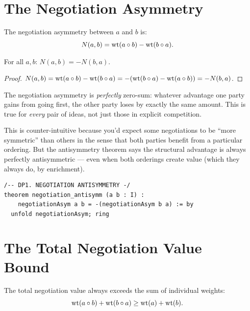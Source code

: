 \section{The Negotiation Asymmetry}

\begin{definition}
The negotiation asymmetry between $a$ and $b$ is:
\[
N(a,b) = \operatorname{wt}(a \circ b) - \operatorname{wt}(b \circ a).
\]
\end{definition}

\begin{theorem}
\label{thm:negotiation-antisymm}
For all $a, b$: $N(a,b) = -N(b,a)$.
\end{theorem}

\begin{proof}
$N(a,b) = \operatorname{wt}(a \circ b) - \operatorname{wt}(b \circ a) = -(\operatorname{wt}(b \circ a) - \operatorname{wt}(a \circ b)) = -N(b,a)$.
\end{proof}

\begin{paradox}
The negotiation asymmetry is \emph{perfectly} zero-sum: whatever advantage one party gains from going first, the other party loses by exactly the same amount. This is true for \emph{every} pair of ideas, not just those in explicit competition.

This is counter-intuitive because you'd expect some negotiations to be ``more symmetric'' than others in the sense that both parties benefit from a particular ordering. But the antisymmetry theorem says the structural advantage is always perfectly antisymmetric --- even when both orderings create value (which they always do, by enrichment).
\end{paradox}

\begin{lstlisting}
/-- DP1. NEGOTIATION ANTISYMMETRY -/
theorem negotiation_antisymm (a b : I) :
    negotiationAsym a b = -(negotiationAsym b a) := by
  unfold negotiationAsym; ring
\end{lstlisting}

\section{The Total Negotiation Value Bound}

\begin{theorem}
\label{thm:total-negotiation}
The total negotiation value always exceeds the sum of individual weights:
\[
\operatorname{wt}(a \circ b) + \operatorname{wt}(b \circ a) \geq \operatorname{wt}(a) + \operatorname{wt}(b).
\]
\end{theorem}

